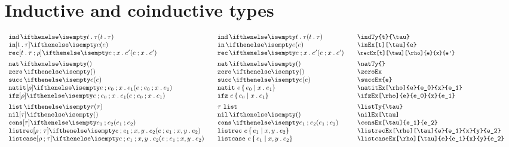 \documentclass[11pt]{article}
\begin{document}
\section*{Inductive and coinductive types}
\begin{small}
  \begin{displaymath}
    \begin{array}{l@{\qquad}l@{\qquad}l@{\qquad}l}
      \indTy{t}{\tau}                            & \indTy*{t}{\tau}                & \verb|\indTy{t}{\tau}|                            \\
      \inEx[t][\tau]{e}                          & \inEx*{e}                       & \verb|\inEx[t][\tau]{e}|                          \\
      \recEx[t][\tau][\rho]{e}{x}{e'}            & \recEx*{e}{x}{e'}               & \small{\verb|\recEx[t][\tau][\rho]{e}{x}{e'}|}    \\[1ex]

      \natTy{}                                   & \natTy*{}                       & \verb|\natTy{}|                                   \\
      \zeroEx                                    & \zeroEx*                        & \verb|\zeroEx|                                    \\
      \succEx{e}                                 & \succEx*{e}                     & \verb|\succEx{e}|                                 \\
      \natitEx[\rho]{e}{e_0}{x}{e_1}             & \natitEx*{e}{e_0}{x}{e_1}       & \verb|\natitEx[\rho]{e}{e_0}{x}{e_1}|             \\
      \ifzEx[\rho]{e}{e_0}{x}{e_1}               & \ifzEx*{e}{e_0}{x}{e_1}         & \verb|\ifzEx[\rho]{e}{e_0}{x}{e_1}|               \\[1ex]

      \listTy{\tau}                              & \listTy*{\tau}                  & \verb|\listTy{\tau}|                              \\
      \nilEx[\tau]                               & \nilEx*{}                       & \verb|\nilEx[\tau]|                               \\
      \consEx[\tau]{e_1}{e_2}                    & \consEx*{e_1}{e_2}              & \verb|\consEx[\tau]{e_1}{e_2}|                    \\
      \listrecEx[\rho][\tau]{e}{e_1}{x}{y}{e_2}  & \listrecEx*{e}{e_1}{x}{y}{e_2}  & \verb|\listrecEx[\rho][\tau]{e}{e_1}{x}{y}{e_2}|  \\
      \listcaseEx[\rho][\tau]{e}{e_1}{x}{y}{e_2} & \listcaseEx*{e}{e_1}{x}{y}{e_2} & \verb|\listcaseEx[\rho][\tau]{e}{e_1}{x}{y}{e_2}| \\[1ex]


\end{array}
\end{displaymath}
\end{small}
\end{document}
